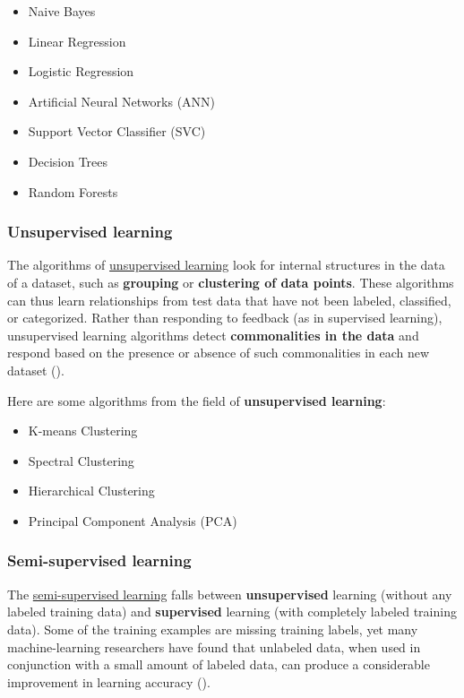 \documentclass [oneside,10pt,a4paper,ngerman,BCOR10mm,headsepline,parindent,final]{scrartcl}
\providecommand{\tightlist}{%
      \setlength{\itemsep}{0pt}\setlength{\parskip}{0pt}}
\begin{document}
\begin{itemize}
\tightlist
\item
  Naive Bayes
\item
  Linear Regression
\item
  Logistic Regression
\item
  Artificial Neural Networks (ANN)
\item
  Support Vector Classifier (SVC)
\item
  Decision Trees
\item
  Random Forests
\end{itemize}

    \hypertarget{unsupervised-learning}{%
\subsubsection{Unsupervised learning}\label{unsupervised-learning}}

The algorithms of
\href{https://en.wikipedia.org/wiki/Unsupervised_learning}{unsupervised
learning} look for internal structures in the data of a dataset, such as
\textbf{grouping} or \textbf{clustering of data points}. These
algorithms can thus learn relationships from test data that have not
been labeled, classified, or categorized. Rather than responding to
feedback (as in supervised learning), unsupervised learning algorithms
detect \textbf{commonalities in the data} and respond based on the
presence or absence of such commonalities in each new dataset
(\cite{Wiki_Unsupervised_learning}).

Here are some algorithms from the field of \textbf{unsupervised
learning}:

\begin{itemize}
\tightlist
\item
  K-means Clustering
\item
  Spectral Clustering
\item
  Hierarchical Clustering
\item
  Principal Component Analysis (PCA)
\end{itemize}

    \hypertarget{semi-supervised-learning}{%
\subsubsection{Semi-supervised
learning}\label{semi-supervised-learning}}

The
\href{https://en.wikipedia.org/wiki/Semi-supervised_learning}{semi-supervised
learning} falls between \textbf{unsupervised} learning (without any
labeled training data) and \textbf{supervised} learning (with completely
labeled training data). Some of the training examples are missing
training labels, yet many machine-learning researchers have found that
unlabeled data, when used in conjunction with a small amount of labeled
data, can produce a considerable improvement in learning accuracy
(\cite{Wiki_Semi-supervised_learning}).
\end{document}
